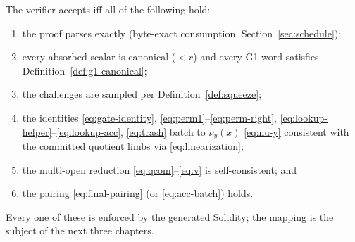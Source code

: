 The verifier accepts iff all of the following hold:
\begin{enumerate}[leftmargin=1.6em,itemsep=2pt]
  \item the proof parses exactly (byte-exact consumption,
        Section~\ref{sec:schedule});
  \item every absorbed scalar is canonical ($< r$) and every G1 word
        satisfies Definition~\ref{def:g1-canonical};
  \item the challenges are sampled per Definition~\ref{def:squeeze};
  \item the identities \eqref{eq:gate-identity}, \eqref{eq:perm1}--\eqref{eq:perm-right},
        \eqref{eq:lookup-helper}--\eqref{eq:lookup-acc}, \eqref{eq:trash}
        batch to $\nu_y(x)$ \eqref{eq:nu-y} consistent with the committed
        quotient limbs via \eqref{eq:linearization};
  \item the multi-open reduction \eqref{eq:qcom}--\eqref{eq:v} is
        self-consistent; and
  \item the pairing \eqref{eq:final-pairing} (or \eqref{eq:acc-batch})
        holds.
\end{enumerate}
Every one of these is enforced by the generated Solidity; the mapping is the
subject of the next three chapters.

